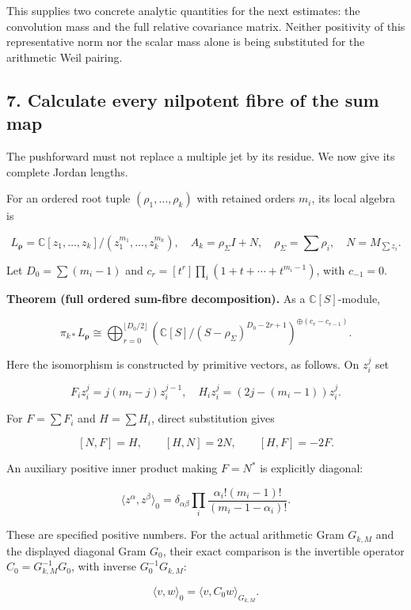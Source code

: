 \documentclass[
]{article}
\begin{document}
This supplies two concrete analytic quantities for the next estimates:
the convolution mass and the full relative covariance matrix. Neither
positivity of this representative norm nor the scalar mass alone is
being substituted for the arithmetic Weil pairing.

\subsection{7. Calculate every nilpotent fibre of the sum
map}\label{calculate-every-nilpotent-fibre-of-the-sum-map}

The pushforward must not replace a multiple jet by its residue. We now
give its complete Jordan lengths.

For an ordered root tuple \((\rho_1,\ldots,\rho_k)\) with retained
orders \(m_i\), its local algebra is

\[L_{\boldsymbol\rho}=\mathbb C[z_1,\ldots,z_k]/(z_1^{m_1},\ldots,z_k^{m_k}),\quad
A_k=\rho_\Sigma I+N,\quad \rho_\Sigma=\sum\rho_i,\quad N=M_{\sum z_i}.\tag{7.1}\]

Let \(D_0=\sum(m_i-1)\) and \(c_r=[t^r]\prod_i(1+t+\cdots+t^{m_i-1})\),
with \(c_{-1}=0\).

\textbf{Theorem (full ordered sum-fibre decomposition).} As a
\(\mathbb C[S]\)-module,

\[\boxed{\pi_{k*}L_{\boldsymbol\rho}\cong
\bigoplus_{r=0}^{\lfloor D_0/2\rfloor}
\left(\mathbb C[S]/(S-\rho_\Sigma)^{D_0-2r+1}\right)^{\oplus(c_r-c_{r-1})}.}\tag{7.2}\]

Here the isomorphism is constructed by primitive vectors, as follows. On
\(z_i^j\) set

\[F_i z_i^j=j(m_i-j)z_i^{j-1},\quad H_i z_i^j=(2j-(m_i-1))z_i^j.\]

For \(F=\sum F_i\) and \(H=\sum H_i\), direct substitution gives

\[[N,F]=H,\qquad[H,N]=2N,\qquad[H,F]=-2F.\tag{7.3}\]

An auxiliary positive inner product making \(F=N^*\) is explicitly
diagonal:

\[\langle z^\alpha,z^\beta\rangle_0=
\delta_{\alpha\beta}\prod_i\frac{\alpha_i!(m_i-1)!}{(m_i-1-\alpha_i)!}.\tag{7.4}\]

These are specified positive numbers. For the actual arithmetic Gram
\(G_{k,M}\) and the displayed diagonal Gram \(G_0\), their exact
comparison is the invertible operator \(C_0=G_{k,M}^{-1}G_0\), with
inverse \(G_0^{-1}G_{k,M}\):

\[\langle v,w\rangle_0=\langle v,C_0w\rangle_{G_{k,M}}.\tag{7.4a}\]
\end{document}

